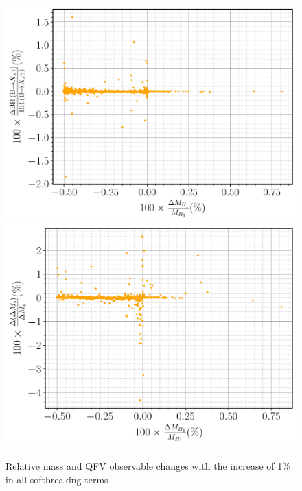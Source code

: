 \begin{figure}[H]
	\centering
	\includegraphics[width=.49\textwidth]{Images/3HDM/Fine_Tuning/Xsgamma_H1.pdf}
    \includegraphics[width=.49\textwidth]{Images/3HDM/Fine_Tuning/DeltaMs_H1.pdf}
	\caption{Relative mass and QFV observable changes with the increase of 1\% in all softbreaking terms}
	\label{fig:3HDM_Fine_Tunning}
\end{figure}	

